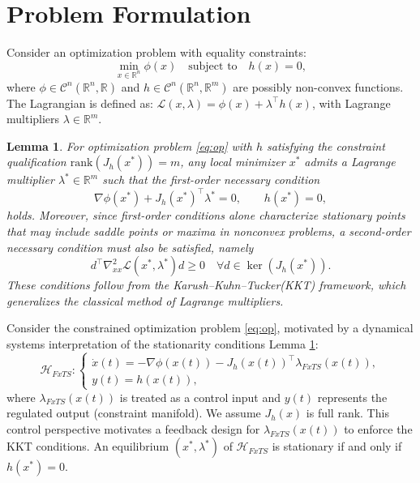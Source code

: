 \documentclass[letterpaper, 10 pt, conference]{ieeeconf}
\newtheorem{lemma}{Lemma}\let\labelindent\relax
\begin{document}
\section{Problem Formulation}
Consider an optimization problem with equality constraints:
\begin{equation}
\min_{x \in \mathbb{R}^n} \phi(x) \quad \text{subject to} \quad h(x) = 0,
\label{eq:op}
\end{equation}
where $\phi \in  \mathcal{C}^n (\mathbb{R}^n,\mathbb{R})$ and $h \in \mathcal{C}^n (\mathbb{R}^n,\mathbb{R}^m)$ are possibly non-convex functions. The Lagrangian is defined as:
$\mathcal{L}(x, \lambda) = \phi(x) + \lambda^\top h(x)$,
with Lagrange multipliers \( \lambda \in \mathbb{R}^m \).
\begin{lemma}\cite{luenberger1984linear} \label{Fonc and SONC}
For optimization problem \eqref{eq:op} with $h$ satisfying the constraint qualification $\mathrm{rank}(J_h(x^*))=m$, any local minimizer $x^*$ admits a Lagrange multiplier $\lambda^*\in\mathbb{R}^m$ such that the first-order necessary condition $$\nabla \phi(x^*) + J_h(x^*)^\top \lambda^* = 0, \qquad h(x^*)=0,$$ holds. Moreover, since first-order conditions alone characterize stationary points that may include saddle points or maxima in nonconvex problems, a second-order necessary condition must also be satisfied, namely $$d^\top \nabla^2_{xx}\mathcal{L}(x^*,\lambda^*) d \ge 0 \quad \forall d \in \ker(J_h(x^*)).$$ These conditions follow from the Karush--Kuhn--Tucker(KKT) framework, which generalizes the classical method of Lagrange multipliers. 
\end{lemma}
Consider the constrained optimization problem \eqref{eq:op}, motivated by \cite{cerone2025new} a dynamical systems interpretation of the stationarity conditions Lemma \ref{Fonc and SONC}:
\begin{equation}
\mathcal{H}_{FxTS}: 
\begin{cases}
\dot{x}(t) = -\nabla \phi(x(t)) - J_h(x(t))^\top \lambda_{FxTS}(x(t)), \label{eq: gf dynamics fx} \\
y(t) = h(x(t)),
\end{cases}
\end{equation}
where $\lambda_{FxTS}(x(t))$ is treated as a control input and $y(t)$ represents the regulated output (constraint manifold). We assume $J_h(x)$ is full rank. This control perspective motivates a feedback design for $\lambda_{FxTS}(x(t))$ to enforce the KKT conditions. An equilibrium $(x^*,\lambda^*)$ of $\mathcal{H}_{FxTS}$ is stationary if and only if $h(x^*)=0$. \\
\end{document}
